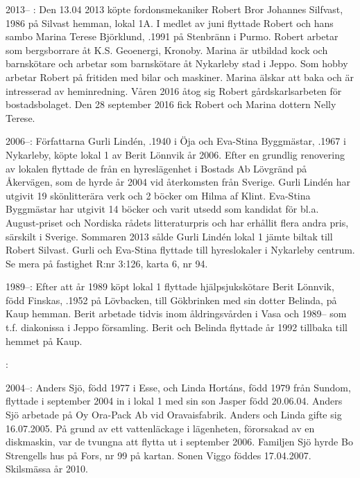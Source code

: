  2013-- :
Den 13.04 2013 köpte fordonsmekaniker Robert Bror Johannes Silfvast,  1986 på Silvast hemman, lokal 1A. I medlet av juni flyttade Robert och hans sambo Marina Terese Björklund, .1991 på Stenbränn i Purmo. Robert arbetar som bergsborrare åt K.S. Geoenergi, Kronoby. Marina är utbildad kock och barnskötare och arbetar som barnskötare åt Nykarleby stad i Jeppo. Som hobby arbetar Robert på fritiden med bilar och maskiner. Marina älskar att baka och är intresserad av heminredning. Våren 2016 åtog sig Robert gårdskarlsarbeten för bostadsbolaget. Den 28 september 2016 fick Robert och Marina dottern Nelly Terese.

	2006--:
Författarna Gurli Lindén, .1940 i Öja och Eva-Stina Byggmästar, .1967 i Nykarleby, köpte lokal 1 av Berit Lönnvik år 2006. Efter en grundlig renovering av lokalen flyttade de från en hyreslägenhet i Bostads Ab Lövgränd på Åkervägen, som de hyrde år 2004 vid återkomsten från Sverige. Gurli Lindén har utgivit 19 skönlitterära verk och 2 böcker om Hilma af Klint. Eva-Stina Byggmästar har utgivit 14 böcker och varit utsedd som kandidat för bl.a. August-priset och Nordiska rådets litteraturpris och har erhållit flera andra pris, särskilt i Sverige. Sommaren 2013 sålde Gurli Lindén lokal 1 jämte biltak till Robert Silvast. Gurli och Eva-Stina flyttade till  hyreslokaler i Nykarleby centrum. Se mera på fastighet R:nr 3:126, karta 6, nr 94.

 1989--:
Efter att år 1989 köpt lokal 1 flyttade hjälpsjukskötare Berit Lönnvik, född Finskas, .1952 på Lövbacken, till Gökbrinken med sin dotter Belinda,  på Kaup hemman. Berit arbetade tidvis inom  åldringsvården i Vasa och 1989-- som t.f. diakonissa i Jeppo församling. Berit och Belinda flyttade år 1992 tillbaka till hemmet på Kaup.

:

2004--: Anders Sjö, född 1977 i Esse, och Linda Hortáns, född 1979 från Sundom, flyttade i september 2004 in i lokal 1 med sin son Jasper född 20.06.04. Anders Sjö arbetade på Oy Ora-Pack Ab vid Oravaisfabrik. Anders och Linda	gifte sig 16.07.2005. På grund av ett vattenläckage i lägenheten, förorsakad av en diskmaskin, var de tvungna	att flytta ut i september 2006. Familjen Sjö hyrde Bo	Strengells hus på Fors, nr 99 på kartan. Sonen Viggo föddes 17.04.2007. Skilsmässa år 2010.

